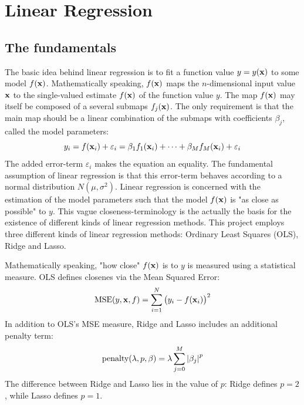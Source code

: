 \documentclass[reprint,english]{revtex4-1}
\begin{document}
\section{Linear Regression}
\subsection{The fundamentals}
The basic idea behind linear regression is to fit a function value \(y=y(\vb{x})\) to some model \(f(\vb{x})\). Mathematically speaking, \(f(\vb{x})\) maps the \(n\)-dimensional input value \(\vb{x}\) to the single-valued estimate \(f(\vb{x})\) of the function value \(y\). The map \(f(\vb{x})\) may itself be composed of a several submaps \(f_j(\vb{x})\). The only requirement is that the main map should be a linear combination of the submaps with coefficients \(\beta_j\), called the model parameters:
\begin{equation}\label{eq:fundamental_linear_regression_equation}
y_i=f(\vb{x}_i)+\varepsilon_i=\beta_1f_1(\vb{x}_i)+\cdots+\beta_Mf_M(\vb{x}_i)+\varepsilon_i
\end{equation}
The added error-term \(\varepsilon_i\) makes the equation an equality. The fundamental assumption of linear regression is that this error-term behaves according to a normal distribution \(N(\mu,\sigma^2)\). Linear regression is concerned with the estimation of the model parameters such that the model \(f(\vb{x})\) is "as close as possible" to \(y\). This vague closeness-terminology is the actually the basis for the existence of different kinds of linear regression methods. This project employs three different kinds of linear regression methods: Ordinary Least Squares (OLS), Ridge and Lasso.

Mathematically speaking, "how close" \(f(\vb{x})\) is to \(y\) is measured using a statistical measure. OLS defines closenes via the Mean Squared Error:
\begin{equation}\label{eq:MSE}
\text{MSE}(y,\vb{x},f)=\sum_{i=1}^N\big(y_i-f(\vb{x}_i)\big)^2
\end{equation}
In addition to OLS's MSE measure, Ridge and Lasso includes an additional penalty term:
\begin{equation}\label{eq:penalty}
\text{penalty}(\lambda,p,\beta)=\lambda\sum_{j=0}^M\abs{\beta_j}^p
\end{equation}
The difference between Ridge and Lasso lies in the value of \(p\): Ridge defines \(p=2\), while Lasso defines \(p=1\).
\end{document}
